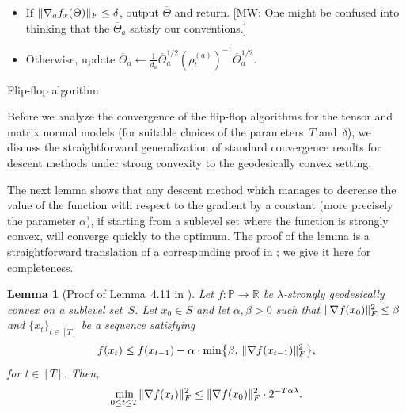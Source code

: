 \documentclass[aos]{imsart}
\newtheorem{lemma}[theorem]{Lemma}
\theoremstyle{definition}
\numberwithin{equation}{section}
\DeclarePairedDelimiter{\norm}{\lVert}{\rVert}
\newcommand{\R}{{\mathbb{R}}}
\newcommand{\otheta}{\overline{\Theta}}
\newcommand{\SPD}{\mathbb{P}}
\newcommand{\MW}[1]{{\color{red}[MW: #1]}}
\newcommand{\MW}[1]{{}}
\begin{document}
\begin{Algorithm}
\begin{enumerate}
\begin{itemize}
\vspace{5pt}

\item
If $\norm{\nabla_a f_x(\Theta)}_F \leq \delta$, output $\otheta$ and return.
\MW{One might be confused into thinking that the $\otheta_a$ satisfy our conventions.}


\item Otherwise, update $\otheta_a \leftarrow \frac{1}{d_a} \otheta_a^{1/2} \left(\rho_t^{(a)}\right)^{-1} \otheta_a^{1/2}$.
\end{itemize}
\end{enumerate}
\caption{Flip-flop algorithm}\label{alg:flip-flop}
\end{Algorithm}

Before we analyze the convergence of the flip-flop algorithms for the tensor and matrix normal models (for suitable choices of the parameters~$T$ and~$\delta$), we discuss the straightforward generalization of standard convergence results for descent methods under strong convexity to the geodesically convex setting.

The next lemma shows that any descent method which manages to decrease the value of the function with respect to the gradient by a constant (more precisely the parameter $\alpha$), if starting from a sublevel set where the function is strongly convex, will converge quickly to the optimum.
The proof of the lemma is a straightforward translation of a corresponding proof in \cite{FM20}; we give it here for completeness.

\begin{lemma}[Proof of Lemma~4.11 in \cite{FM20}]\label{lem:descent-sublevel-set}
	Let $f \colon \SPD \rightarrow \R$ be $\lambda$-strongly geodesically convex on a sublevel set~$S$.
  Let $x_0 \in S$ and let $\alpha,\beta>0$ such that $\norm{\nabla f(x_0)}_F^2 \leq \beta$ and $\{x_t\}_{t\in[T]}$ be a sequence satisfying
  \begin{align}\label{eq:descent prop}
    f(x_t) \leq f(x_{t-1}) - \alpha \cdot \min \bigl\{\beta, \, \norm{\nabla f(x_{t-1})}^2_F \bigr\},
  \end{align}
  for $t\in[T]$.
  Then,
  \begin{align*}
    \min_{0\leq t\leq T} \norm{\nabla f(x_t)}^2_F \leq \norm{\nabla f(x_0)}_F^2 \cdot 2^{- T \alpha \lambda}.
  \end{align*}
\end{lemma}
\end{document}
